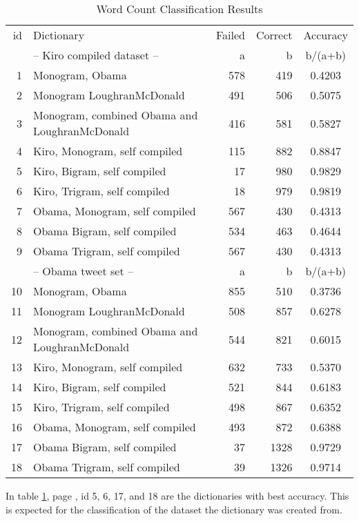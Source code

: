 \begin{table}
\centering
\label{tbl:sentiment_word_count_results}
\caption{Word Count Classification Results}
\begin{tabular}{ r p{6cm} r r c }
id & Dictionary & Failed & Correct & Accuracy \\
& -- Kiro compiled dataset -- & a & b & b/(a+b) \\
\hline
1 & Monogram, Obama & 578 & 419 & 0.4203 \\
2 & Monogram LoughranMcDonald & 491 & 506 & 0.5075 \\
3 & Monogram, combined Obama and LoughranMcDonald & 416 & 581 & 0.5827 \\
4 & Kiro, Monogram, self compiled & 115 & 882 & 0.8847 \\
5 & Kiro, Bigram, self compiled & 17 & 980 & 0.9829 \\
6 & Kiro, Trigram, self compiled & 18 & 979 & 0.9819 \\
7 & Obama, Monogram, self compiled & 567 & 430 & 0.4313 \\
8 & Obama Bigram, self compiled & 534 & 463 & 0.4644 \\
9 & Obama Trigram, self compiled & 567 & 430 & 0.4313 \\
& -- Obama tweet set -- & a & b & b/(a+b) \\
\hline
10 & Monogram, Obama & 855 & 510 & 0.3736 \\
11 & Monogram LoughranMcDonald & 508 & 857 & 0.6278 \\
12 & Monogram, combined Obama and LoughranMcDonald & 544 & 821 & 0.6015 \\
13 & Kiro, Monogram, self compiled & 632 & 733 & 0.5370 \\
14 & Kiro, Bigram, self compiled & 521 & 844 & 0.6183 \\
15 & Kiro, Trigram, self compiled & 498 & 867 & 0.6352 \\
16 & Obama, Monogram, self compiled & 493 & 872 & 0.6388 \\
17 & Obama Bigram, self compiled & 37 & 1328 & 0.9729 \\
18 & Obama Trigram, self compiled & 39 & 1326 & 0.9714 \\
\end{tabular}
\end{table}

In table \ref{tbl:sentiment_word_count_results}, page
\pageref{tbl:sentiment_word_count_results}, id 5, 6, 17, and 18 are the
dictionaries with best accuracy. This is expected for the classification
of the dataset the dictionary was created from. 

